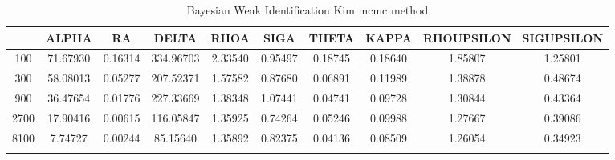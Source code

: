 \documentclass[a4paper,10pt]{article}
\begin{document}
\centering
\begin{longtable}{cccccccccc}
\toprule
 & ALPHA & RA & DELTA & RHOA & SIGA & THETA & KAPPA & RHOUPSILON & SIGUPSILON \\
\midrule
100 & 71.67930 & 0.16314 & 334.96703 & 2.33540 & 0.95497 & 0.18745 & 0.18640 & 1.85807 & 1.25801 \\
300 & 58.08013 & 0.05277 & 207.52371 & 1.57582 & 0.87680 & 0.06891 & 0.11989 & 1.38878 & 0.48674 \\
900 & 36.47654 & 0.01776 & 227.33669 & 1.38348 & 1.07441 & 0.04741 & 0.09728 & 1.30844 & 0.43364 \\
2700 & 17.90416 & 0.00615 & 116.05847 & 1.35925 & 0.74264 & 0.05246 & 0.09988 & 1.27667 & 0.39086 \\
8100 & 7.74727 & 0.00244 & 85.15640 & 1.35892 & 0.82375 & 0.04136 & 0.08509 & 1.26054 & 0.34923 \\
\bottomrule
\caption{Bayesian Weak Identification Kim mcmc method}
\label{table:tbl:WeakKim_mcmc}
\end{longtable}
\end{document}
